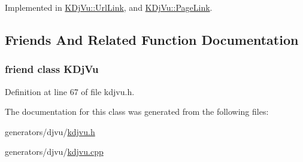 Implemented in \hyperlink{classKDjVu_1_1UrlLink_a2c6a7e31c7fcf8b3cbf5b577e1d63dbf}{K\+Dj\+Vu\+::\+Url\+Link}, and \hyperlink{classKDjVu_1_1PageLink_a3ed01b7b48403d996988b20038dc080f}{K\+Dj\+Vu\+::\+Page\+Link}.



\subsection{Friends And Related Function Documentation}
\hypertarget{classKDjVu_1_1Link_a4241ce0336d22245ffdb13dd5cb6edcc}{
\subsubsection[{K\+Dj\+Vu}]{\setlength{\rightskip}{0pt plus 5cm}friend class {\bf K\+Dj\+Vu}\hspace{0.3cm}{\ttfamily [friend]}}}\label{classKDjVu_1_1Link_a4241ce0336d22245ffdb13dd5cb6edcc}


Definition at line 67 of file kdjvu.\+h.



The documentation for this class was generated from the following files\+:\begin{DoxyCompactItemize}
\item 
generators/djvu/\hyperlink{kdjvu_8h}{kdjvu.\+h}\item 
generators/djvu/\hyperlink{kdjvu_8cpp}{kdjvu.\+cpp}\end{DoxyCompactItemize}
